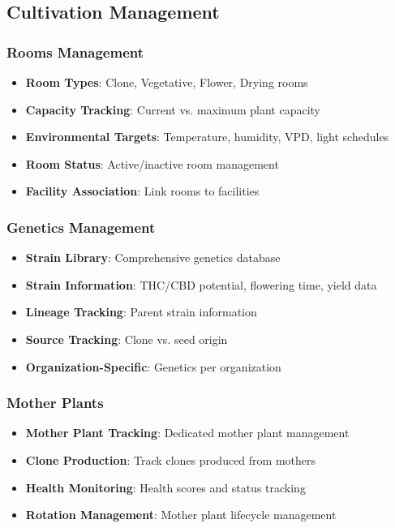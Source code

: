\documentclass[11pt,a4paper]{article}
\begin{document}
\subsection{Cultivation Management}

\subsubsection{Rooms Management}
\begin{itemize}
    \item \textbf{Room Types}: Clone, Vegetative, Flower, Drying rooms
    \item \textbf{Capacity Tracking}: Current vs. maximum plant capacity
    \item \textbf{Environmental Targets}: Temperature, humidity, VPD, light schedules
    \item \textbf{Room Status}: Active/inactive room management
    \item \textbf{Facility Association}: Link rooms to facilities
\end{itemize}

\subsubsection{Genetics Management}
\begin{itemize}
    \item \textbf{Strain Library}: Comprehensive genetics database
    \item \textbf{Strain Information}: THC/CBD potential, flowering time, yield data
    \item \textbf{Lineage Tracking}: Parent strain information
    \item \textbf{Source Tracking}: Clone vs. seed origin
    \item \textbf{Organization-Specific}: Genetics per organization
\end{itemize}

\subsubsection{Mother Plants}
\begin{itemize}
    \item \textbf{Mother Plant Tracking}: Dedicated mother plant management
    \item \textbf{Clone Production}: Track clones produced from mothers
    \item \textbf{Health Monitoring}: Health scores and status tracking
    \item \textbf{Rotation Management}: Mother plant lifecycle management
\end{itemize}
\end{document}
